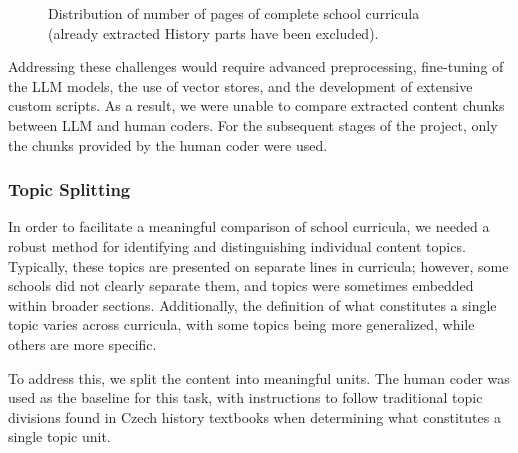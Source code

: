 \documentclass[]{interact}
\theoremstyle{plain}%
\theoremstyle{definition}
\theoremstyle{remark}
\begin{document}
\begin{figure} \centering {} \caption{Distribution of number of pages of complete school curricula (already extracted History parts have been excluded).} \label{figure:pages-distribution-plot} \end{figure}


Addressing these challenges would require advanced preprocessing, fine-tuning of the LLM models, the use of vector stores, and the development of extensive custom scripts. As a result, we were unable to compare extracted content chunks between LLM and human coders. For the subsequent stages of the project, only the chunks provided by the human coder were used.

\subsubsection{Topic Splitting}

In order to facilitate a meaningful comparison of school curricula, we needed a robust method for identifying and distinguishing individual content topics. Typically, these topics are presented on separate lines in curricula; however, some schools did not clearly separate them, and topics were sometimes embedded within broader sections. Additionally, the definition of what constitutes a single topic varies across curricula, with some topics being more generalized, while others are more specific.

To address this, we split the content into meaningful units. The human coder was used as the baseline for this task, with instructions to follow traditional topic divisions found in Czech history textbooks when determining what constitutes a single topic unit.
\end{document}
